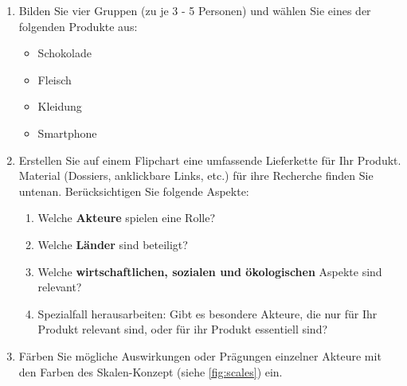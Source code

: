\begin{myexercise}
    \begin{enumerate}
        \item Bilden Sie vier Gruppen (zu je 3 - 5 Personen) und wählen Sie eines der folgenden Produkte aus:
              \begin{itemize}
                  \item Schokolade
                  \item Fleisch
                  \item Kleidung
                  \item Smartphone
              \end{itemize}

        \item Erstellen Sie auf einem Flipchart eine umfassende Lieferkette für Ihr Produkt. Material (Dossiers, anklickbare Links, etc.) für ihre Recherche finden Sie untenan.
              Berücksichtigen Sie folgende Aspekte:
              \begin{enumerate}
                  \item Welche \textbf{Akteure} spielen eine Rolle?
                  \item Welche \textbf{Länder} sind beteiligt?
                  \item Welche \textbf{wirtschaftlichen, sozialen und ökologischen} Aspekte sind relevant?
                  \item Spezialfall herausarbeiten: Gibt es besondere Akteure, die nur für Ihr Produkt relevant sind, oder für ihr Produkt essentiell sind?
              \end{enumerate}
        \item Färben Sie mögliche Auswirkungen oder Prägungen einzelner Akteure mit den Farben des Skalen-Konzept (siehe \cref{fig:scales}) ein.
    \end{enumerate}


\end{myexercise}
